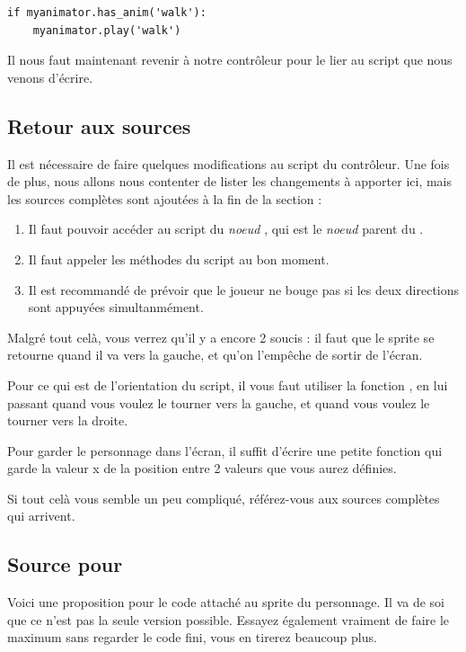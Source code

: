 \begin{lstlisting}
if myanimator.has_anim('walk'):
    myanimator.play('walk')
\end{lstlisting}

Il nous faut maintenant revenir à notre contrôleur pour le lier au script que nous venons d'écrire.

\subsection{Retour aux sources}

Il est nécessaire de faire quelques modifications au script du contrôleur. Une fois de plus, nous allons nous contenter de lister les changements à apporter ici, mais les sources complètes sont ajoutées à la fin de la section :

\begin{enumerate}
\item Il faut pouvoir accéder au script du \emph{noeud} , qui est le \emph{noeud} parent du .
\item Il faut appeler les méthodes du script  au bon moment.
\item Il est recommandé de prévoir que le joueur ne bouge pas si les deux directions sont appuyées simultanmément.
\end{enumerate}

Malgré tout celà, vous verrez qu'il y a encore 2 soucis : il faut que le sprite se retourne quand il va vers la gauche, et qu'on l'empêche de sortir de l'écran.

Pour ce qui est de l'orientation du script, il vous faut utiliser la fonction , en lui passant  quand vous voulez le tourner vers la gauche, et  quand vous voulez le tourner vers la droite.

Pour garder le personnage dans l'écran, il suffit d'écrire une petite fonction qui garde la valeur x de la position entre 2 valeurs que vous aurez définies.

Si tout celà vous semble un peu compliqué, référez-vous aux sources complètes qui arrivent.

\subsection{Source pour }

Voici une proposition pour le code attaché au sprite du personnage. Il va de soi que ce n'est pas la seule version possible. Essayez également vraiment de faire le maximum sans regarder le code fini, vous en tirerez beaucoup plus.

